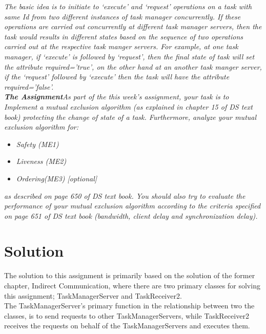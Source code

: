 \textit{The basic idea is to initiate to ‘execute’ and ‘request’ operations on a task with same Id from two different instances of task manager concurrently. If these operations are carried out concurrently at different task manager servers, then the task would results in different states based on the sequence of two operations carried out at the respective task manger servers.  For example, at one task manager, if ‘execute’ is followed by ‘request’, then the final state of task will set the attribute required=’true’, on the other hand at an another task manger server, if the ‘request’ followed by ‘execute’ then the task will have the attribute required=’false’.}\\

\textit{\textbf{The Assignment}\newline As part of the this week’s assignment, your task is to Implement a mutual exclusion algorithm (as explained in chapter 15 of DS text book) protecting the change of state of a task. Furthermore, analyze your mutual exclusion algorithm for:}

\begin{itemize}
\item \textit{Safety (ME1)}
\item \textit{Liveness (ME2)}
\item \textit{Ordering(ME3) [optional]}
\end{itemize}

\textit{as described on page 650 of DS text book. You should also try to evaluate the performance of your mutual exclusion algorithm according to the criteria specified on page 651 of DS text book (bandwidth, client delay and synchronization delay).}

\section{Solution}
\label{MutualExclusion_solution}
The solution to this assignment is primarily based on the solution of the former chapter, Indirect Communication, where there are two primary classes for solving this assignment; TaskManagerServer and TaskReceiver2. \\

The TaskManagerServer's primary function in the relationship between two the classes, is to send requests to other TaskManagerServers, while TaskReceiver2 receives the requests on behalf of the TaskManagerServers and executes them. \\

